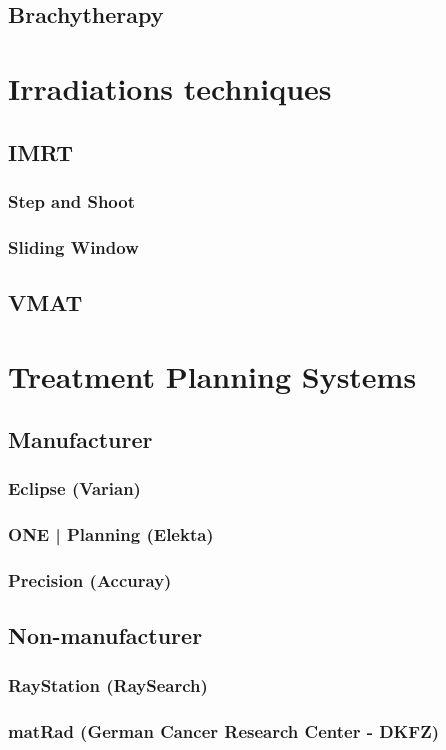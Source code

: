 \subsection{Brachytherapy}

\section{Irradiations techniques}
\subsection{IMRT}
\subsubsection{Step and Shoot}
\subsubsection{Sliding Window}
\subsection{VMAT}

\section{Treatment Planning Systems}
\subsection{Manufacturer}
\subsubsection{Eclipse (Varian)}
\subsubsection{ONE | Planning (Elekta)}
\subsubsection{Precision (Accuray)}
\subsection{Non-manufacturer}
\subsubsection{RayStation (RaySearch)}
\subsubsection{matRad (German Cancer Research Center - DKFZ)}
